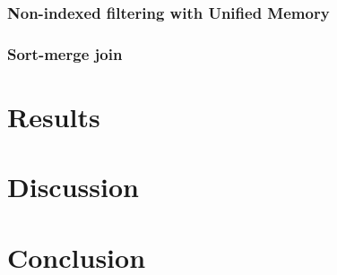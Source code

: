 \documentclass[a4paper,titlepage]{article}
\begin{document}
\subsubsection{Non-indexed filtering with Unified Memory}

\subsubsection{Sort-merge join}

\section{Results}
\label{sec:results}

\section{Discussion}
\label{sec:discussion}

\section{Conclusion}
\label{sec:conclusion}

{}

\end{document}
